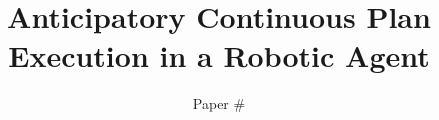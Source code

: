 \documentclass[a4paper]{article}
\begin{document}
\title{Anticipatory Continuous Plan Execution in a Robotic Agent}
\author{Paper \#}
\maketitle{}

\begin{abstract}

\end{abstract}

%





 
%







\twocolumn 


\end{document}
